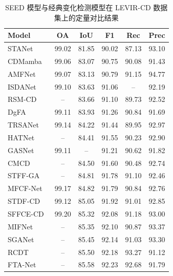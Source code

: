 \begin{table}[!htbp]
\centering
\caption{SEED 模型与经典变化检测模型在 LEVIR-CD 数据集上的定量对比结果}
\label{tab:seed_levir}
\begin{tabular}{lccccc}
\hline
\textbf{Model} & \textbf{OA} & \textbf{IoU} & \textbf{F1} & \textbf{Rec} & \textbf{Prec} \\
\hline
STANet~\cite{chen_spatial-temporal_2020}   & 99.02 & 81.85 & 90.02 & 87.13 & 93.10 \\
CDMamba~\cite{zhang_cdmamba_2025}          & 99.06 & 83.07 & 90.75 & 90.08 & 91.43 \\
AMFNet~\cite{zhan_amfnet_2024}             & 99.07 & 83.13 & 90.79 & 91.15 & 94.77 \\
ISDANet~\cite{h_ren_interactive_2025}      & 99.10 & 83.63 & 91.06 & --    & 92.19 \\
RSM-CD~\cite{zhao_rs-mamba_2024}           & --    & 83.66 & 91.10 & 89.73 & 92.52 \\
DgFA~\cite{f_zhou_dual-granularity_2025}   & 99.11 & 83.93 & 91.26 & 90.84 & 91.69 \\
TRSANet~\cite{j_li_trsanet_2024}           & 99.14 & 84.22 & 91.44 & 89.95 & 92.97 \\
HATNet~\cite{Xu2024HybridAT}             & --    & 84.41 & 91.55 & 90.23 & 92.90 \\
GASNet~\cite{zhang_global-aware_2023}      & 99.11 & --    & 91.21 & 90.62 & 91.82 \\
CMCD~\cite{li_cmcd_2025}                   & --    & 84.50 & 91.60 & 90.48 & 92.74 \\
STFF-GA~\cite{h_wei_spatio-temporal_2024}   & --  & 84.81   & 91.78  & 91.10  & 92.46 \\
MFCF-Net~\cite{b_huang_remote-sensing_2024} & 99.17  & 84.82  & 91.79  & 90.84  & 92.76 \\
STDF-CD~\cite{y_zhou_stdf_2025}            & 99.12 & 85.05 & 91.92 & 91.01 & 92.85 \\
SFFCE-CD~\cite{y_xing_sffce-cd_2025}       & 99.20 & 85.32 & 92.08 & 91.18 & 93.00 \\
MIFNet~\cite{w_xie_mifnet_2025}            & --  & 85.35 & 92.10 & 90.87 & 93.37 \\
SGANet~\cite{j_chen_sganet_2025}           & --    & 85.45 & 92.14 & 91.03 & 93.30 \\
RCDT~\cite{lu_cross_2024}                  & --    & 85.50 & 92.18 & 93.27 & 91.12 \\
FTA-Net~\cite{t_zhu_fta-net_2025}          & --    & 85.58 & 92.23 & 92.68 & 91.79 \\

\end{tabular}
\end{table}
